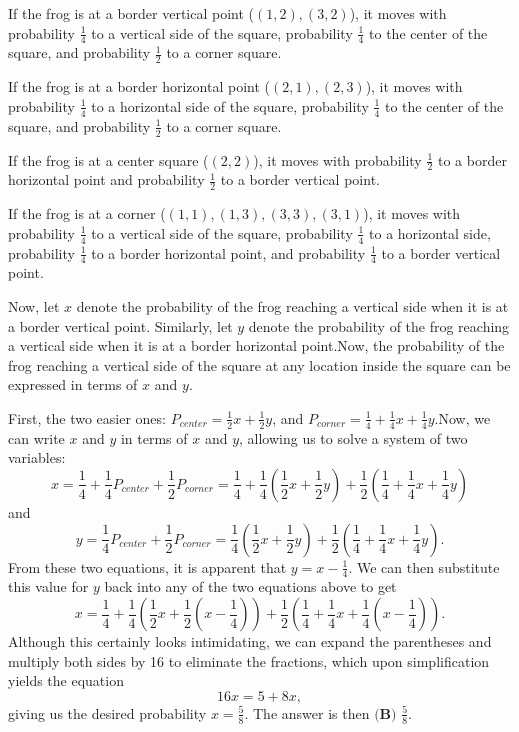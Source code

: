 \begin{enumerate}
 If the frog is at a border vertical point ($(1,2),(3,2)$), it moves with probability $\frac{1}{4}$ to a vertical side of the square, probability $\frac{1}{4}$ to the center of the square, and probability $\frac{1}{2}$ to a corner square.

 If the frog is at a border horizontal point ($(2,1),(2,3)$), it moves with probability $\frac{1}{4}$ to a horizontal side of the square, probability $\frac{1}{4}$ to the center of the square, and probability $\frac{1}{2}$ to a corner square.

 If the frog is at a center square ($(2,2)$), it moves with probability $\frac{1}{2}$ to a border horizontal point and probability $\frac{1}{2}$ to a border vertical point.

 If the frog is at a corner ($(1,1),(1,3),(3,3),(3,1)$), it moves with probability $\frac{1}{4}$ to a vertical side of the square, probability $\frac{1}{4}$ to a horizontal side, probability $\frac{1}{4}$ to a border horizontal point, and probability $\frac{1}{4}$ to a border vertical point.

 Now, let $x$ denote the probability of the frog reaching a vertical side when it is at a border vertical point. Similarly, let $y$ denote the probability of the frog reaching a vertical side when it is at a border horizontal point.Now, the probability of the frog reaching a vertical side of the square at any location inside the square can be expressed in terms of $x$ and $y$.

 First, the two easier ones: $P_{center}=\frac{1}{2}x+\frac{1}{2}y$, and $P_{corner}=\frac{1}{4}+\frac{1}{4}x+\frac{1}{4}y$.Now, we can write $x$ and $y$ in terms of $x$ and $y$, allowing us to solve a system of two variables:
 \[x=\frac{1}{4}+\frac{1}{4}P_{center}+\frac{1}{2}P_{corner}=\frac{1}{4}+\frac{1}{4}\left(\frac{1}{2}x+\frac{1}{2}y\right)+\frac{1}{2}\left(\frac{1}{4}+\frac{1}{4}x+\frac{1}{4}y\right)\]and 
 \[y=\frac{1}{4}P_{center}+\frac{1}{2}P_{corner}=\frac{1}{4}\left(\frac{1}{2}x+\frac{1}{2}y\right)+\frac{1}{2}\left(\frac{1}{4}+\frac{1}{4}x+\frac{1}{4}y\right).\]From these two equations, it is apparent that $y=x-\frac{1}{4}$. We can then substitute this value for $y$ back into any of the two equations above to get 
 \[x=\frac{1}{4}+\frac{1}{4}\left(\frac{1}{2}x+\frac{1}{2}\left(x-\frac{1}{4}\right)\right)+\frac{1}{2}\left(\frac{1}{4}+\frac{1}{4}x+\frac{1}{4}\left(x-\frac{1}{4}\right)\right).\] Although this certainly looks intimidating, we can expand the parentheses and multiply both sides by 16 to eliminate the fractions, which upon simplification yields the equation 
 \[16x=5+8x,\] giving us the desired probability $x=\frac{5}{8}$. The answer is then $\boxed{\textbf{(B) }\frac{5}{8}}$.


\end{enumerate}
